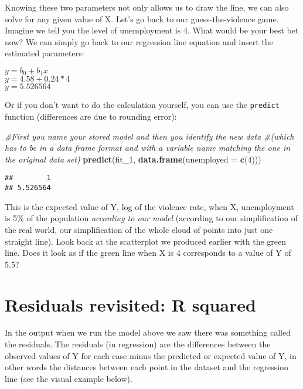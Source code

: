\documentclass[
]{book}
\newenvironment{Shaded}{\begin{snugshade}}{\end{snugshade}}
\newcommand{\AttributeTok}[1]{\textcolor[rgb]{0.13,0.29,0.53}{#1}}
\newcommand{\CommentTok}[1]{\textcolor[rgb]{0.56,0.35,0.01}{\textit{#1}}}
\newcommand{\DecValTok}[1]{\textcolor[rgb]{0.00,0.00,0.81}{#1}}
\newcommand{\FunctionTok}[1]{\textcolor[rgb]{0.13,0.29,0.53}{\textbf{#1}}}
\newcommand{\NormalTok}[1]{#1}
\begin{document}
Knowing these two parameters not only allows us to draw the line, we can also solve for any given value of X. Let's go back to our guess-the-violence game. Imagine we tell you the level of unemployment is 4. What would be your best bet now? We can simply go back to our regression line equation and insert the estimated parameters:

\(y = b_0 + b_1x\)\\
\(y = 4.58 + 0.24 * 4\)\\
\(y = 5.526564\)

Or if you don't want to do the calculation yourself, you can use the \texttt{predict} function (differences are due to rounding error):

\begin{Shaded}
\begin{Highlighting}[]
\CommentTok{\#First you name your stored model and then you identify the new data }
\CommentTok{\#(which has to be in a data frame format and with a variable name matching the one in the original data set)}
\FunctionTok{predict}\NormalTok{(fit\_1, }\FunctionTok{data.frame}\NormalTok{(}\AttributeTok{unemployed =} \FunctionTok{c}\NormalTok{(}\DecValTok{4}\NormalTok{))) }
\end{Highlighting}
\end{Shaded}

\begin{verbatim}
##        1 
## 5.526564
\end{verbatim}

This is the expected value of Y, log of the violence rate, when X, unemployment is 5\% of the population \emph{according to our model} (according to our simplification of the real world, our simplification of the whole cloud of points into just one straight line). Look back at the scatterplot we produced earlier with the green line. Does it look as if the green line when X is 4 corresponds to a value of Y of 5.5?

\section{Residuals revisited: R squared}\label{residuals-revisited-r-squared}

In the output when we run the model above we saw there was something called the residuals. The residuals (in regression) are the differences between the observed values of Y for each case minus the predicted or expected value of Y, in other words the distances between each point in the dataset and the regression line (see the visual example below).
\end{document}
